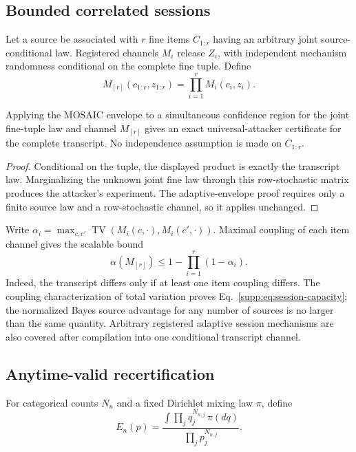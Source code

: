 \subsection{Bounded correlated sessions}

Let a source be associated with $r$ fine items
$C_{1:r}$ having an arbitrary joint source-conditional law. Registered
channels $M_i$ release $Z_i$, with independent mechanism randomness
conditional on the complete fine tuple. Define
\[
M_{[r]}(c_{1:r},z_{1:r})=\prod_{i=1}^r M_i(c_i,z_i).
\]

\begin{theorem}
Applying the MOSAIC envelope to a simultaneous confidence region for the joint
fine-tuple law and channel $M_{[r]}$ gives an exact universal-attacker
certificate for the complete transcript. No independence assumption is made
on $C_{1:r}$.
\end{theorem}

\begin{proof}
Conditional on the tuple, the displayed product is exactly the transcript
law. Marginalizing the unknown joint fine law through this row-stochastic
matrix produces the attacker's experiment. The adaptive-envelope proof
requires only a finite source law and a row-stochastic channel, so it applies
unchanged.
\end{proof}

Write
$\alpha_i=\max_{c,c'}\operatorname{TV}(M_i(c,\cdot),M_i(c',\cdot))$.
Maximal coupling of each item channel gives the scalable bound
\begin{equation}
\alpha(M_{[r]})\leq1-\prod_{i=1}^r(1-\alpha_i).
\label{supp:eq:session-capacity}
\end{equation}
Indeed, the transcript differs only if at least one item coupling differs.
The coupling characterization of total variation proves
Eq.~\eqref{supp:eq:session-capacity}; the normalized Bayes source advantage
for any number of sources is no larger than the same quantity. Arbitrary
registered adaptive session mechanisms are also covered after compilation
into one conditional transcript channel.

\subsection{Anytime-valid recertification}

For categorical counts $N_n$ and a fixed Dirichlet mixing law $\pi$, define
\begin{equation}
E_n(p)=
\frac{\int\prod_jq_j^{N_{n,j}}\,\pi(dq)}
{\prod_jp_j^{N_{n,j}}}.
\end{equation}

